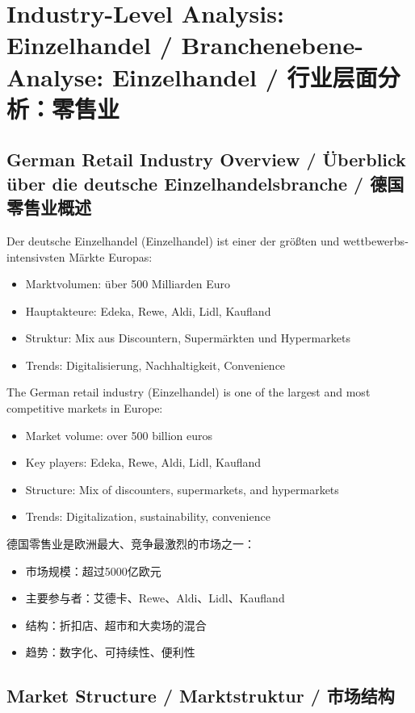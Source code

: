 \chapter{Industry-Level Analysis: Einzelhandel / Branchenebene-Analyse: Einzelhandel / 行业层面分析：零售业}

\section{German Retail Industry Overview / Überblick über die deutsche Einzelhandelsbranche / 德国零售业概述}

\begin{otherlanguage}{ngerman}
Der deutsche Einzelhandel (Einzelhandel) ist einer der größten und wettbewerbsintensivsten Märkte Europas:
\begin{itemize}
    \item Marktvolumen: über 500 Milliarden Euro
    \item Hauptakteure: Edeka, Rewe, Aldi, Lidl, Kaufland
    \item Struktur: Mix aus Discountern, Supermärkten und Hypermarkets
    \item Trends: Digitalisierung, Nachhaltigkeit, Convenience
\end{itemize}
\end{otherlanguage}

The German retail industry (Einzelhandel) is one of the largest and most competitive markets in Europe:
\begin{itemize}
    \item Market volume: over 500 billion euros
    \item Key players: Edeka, Rewe, Aldi, Lidl, Kaufland
    \item Structure: Mix of discounters, supermarkets, and hypermarkets
    \item Trends: Digitalization, sustainability, convenience
\end{itemize}

德国零售业是欧洲最大、竞争最激烈的市场之一：
\begin{itemize}
    \item 市场规模：超过5000亿欧元
    \item 主要参与者：艾德卡、Rewe、Aldi、Lidl、Kaufland
    \item 结构：折扣店、超市和大卖场的混合
    \item 趋势：数字化、可持续性、便利性
\end{itemize}

\section{Market Structure / Marktstruktur / 市场结构}

